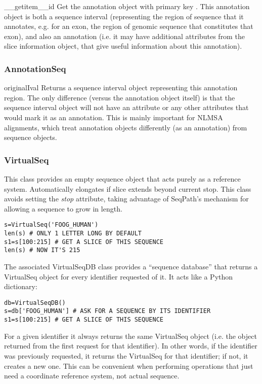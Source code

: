 \documentclass{howto}
\begin{document}
\begin{funcdesc}{__getitem__}{id}
  Get the annotation object with primary key .  This annotation object
  is both a sequence interval (representing the region of sequence that it
  annotates, e.g. for an exon, the region of genomic sequence that constitutes
  that exon), and also an annotation (i.e. it may have additional attributes
  from the slice information object, that give useful information about this
  annotation).
\end{funcdesc}

\subsubsection{AnnotationSeq}
\begin{funcdesc}{originalIval}{}
  Returns a sequence interval object representing this annotation region.
  The only difference (versus the annotation object itself) is that the
  sequence interval object will not have an  attribute or
  any other attributes that would mark it as an annotation.  This is mainly
  important for NLMSA alignments, which treat annotation objects differently
  (as an annotation) from sequence objects.
\end{funcdesc}



\subsubsection{VirtualSeq}
This class provides an empty sequence object that
acts purely as a reference system.
Automatically elongates if slice extends beyond current stop.
This class avoids setting the {\em stop} attribute, taking advantage
of SeqPath's mechanism for allowing a sequence to grow in length.
\begin{verbatim}
s=VirtualSeq('FOOG_HUMAN')
len(s) # ONLY 1 LETTER LONG BY DEFAULT
s1=s[100:215] # GET A SLICE OF THIS SEQUENCE
len(s) # NOW IT'S 215
\end{verbatim}

The associated VirtualSeqDB class provides a ``sequence database''
that returns a VirtualSeq object for every identifier requested of
it.  It acts like a Python dictionary:
\begin{verbatim}
db=VirtualSeqDB()
s=db['FOOG_HUMAN'] # ASK FOR A SEQUENCE BY ITS IDENTIFIER
s1=s[100:215] # GET A SLICE OF THIS SEQUENCE
\end{verbatim}
For a given identifier it always returns the same VirtualSeq
object (i.e. the object returned from the first request for that identifier).
In other words, if the identifier was previously requested,
it returns the VirtualSeq for that identifier; if not, it 
creates a new one.
This can be convenient when performing operations that just
need a coordinate reference system, not actual sequence.
\end{document}
